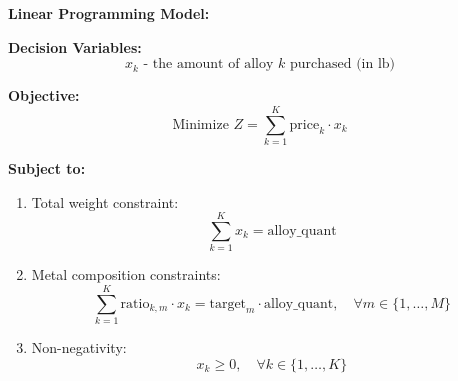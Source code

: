 \documentclass{article}
\begin{document}
\textbf{Linear Programming Model:}

\textbf{Decision Variables:}
\[
x_k \text{ - the amount of alloy } k \text{ purchased (in lb)}
\]

\textbf{Objective:}
\[
\text{Minimize } Z = \sum_{k=1}^{K} \text{price}_k \cdot x_k
\]

\textbf{Subject to:}

\begin{enumerate}
    \item Total weight constraint:
    \[
    \sum_{k=1}^{K} x_k = \text{alloy\_quant}
    \]

    \item Metal composition constraints:
    \[
    \sum_{k=1}^{K} \text{ratio}_{k, m} \cdot x_k = \text{target}_m \cdot \text{alloy\_quant}, \quad \forall m \in \{1, \ldots, M\}
    \]

    \item Non-negativity:
    \[
    x_k \geq 0, \quad \forall k \in \{1, \ldots, K\}
    \]
\end{enumerate}
\end{document}

